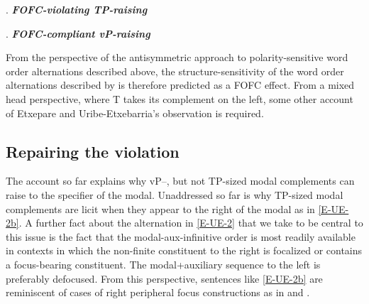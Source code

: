 \documentclass[output=paper]{langscibook}
\begin{document}
\ex. \textbf{\textit{FOFC-violating TP-raising}} \protect\label{tree-8} \\  \samepage
{}

\vspace{.5cm}
 
\ex. \textbf{\textit{FOFC-compliant vP-raising}} \protect\label{tree-9} \\  \samepage
{}

\vspace{.5cm}


From the perspective of the antisymmetric approach to polarity-sensitive word order alternations described above, the structure-sensitivity of the word order alternations described by \cite{etxepare-uribeetxebarria2009} is therefore predicted as a FOFC effect. From a mixed head perspective, where T takes its complement on the left, some other account of Etxepare and Uribe-Etxebarria's observation is required.\protect\footnotemark\protect{}


\subsection{Repairing the violation}

The account so far explains why vP--, but not TP-sized modal complements can raise to the specifier of the modal.  Unaddressed so far is why TP-sized modal complements are licit when they appear to the right of the modal as in \protect\ref{E-UE-2b}.  A further fact about the alternation in \protect\ref{E-UE-2} that we take to be central to this issue is the fact that the modal-aux-infinitive order is most readily available in contexts in which the non-finite constituent to the right is focalized or contains a focus-bearing constituent. The modal+auxiliary sequence to the left is preferably defocused.  From this perspective, sentences like \protect\ref{E-UE-2b} are reminiscent of cases of right peripheral focus constructions as in \Next and \NNext.
\end{document}
